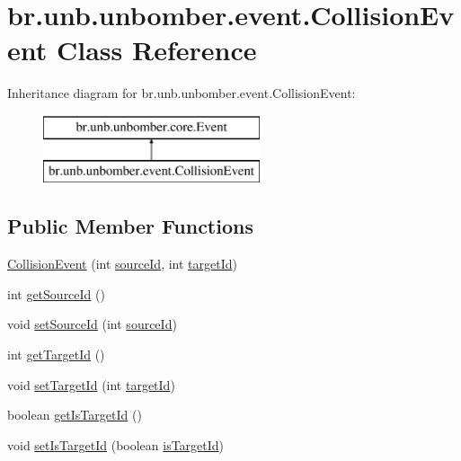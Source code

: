 \hypertarget{classbr_1_1unb_1_1unbomber_1_1event_1_1_collision_event}{\section{br.\+unb.\+unbomber.\+event.\+Collision\+Event Class Reference}
\label{classbr_1_1unb_1_1unbomber_1_1event_1_1_collision_event}
}
Inheritance diagram for br.\+unb.\+unbomber.\+event.\+Collision\+Event\+:\begin{figure}[H]
\begin{center}
\leavevmode
\includegraphics[height=2.000000cm]{classbr_1_1unb_1_1unbomber_1_1event_1_1_collision_event}
\end{center}
\end{figure}
\subsection*{Public Member Functions}
\begin{DoxyCompactItemize}
\item 
\hyperlink{classbr_1_1unb_1_1unbomber_1_1event_1_1_collision_event_ab0f58187e39af806abfcc6d635abfe55}{Collision\+Event} (int \hyperlink{classbr_1_1unb_1_1unbomber_1_1event_1_1_collision_event_a3115ab5eb686ecea5e7629e6fbb02be4}{source\+Id}, int \hyperlink{classbr_1_1unb_1_1unbomber_1_1event_1_1_collision_event_a3b46d8cfa814478929fb264594f4c1eb}{target\+Id})
\item 
int \hyperlink{classbr_1_1unb_1_1unbomber_1_1event_1_1_collision_event_a623f5db9c099c2214b53a775bc23e73a}{get\+Source\+Id} ()
\item 
void \hyperlink{classbr_1_1unb_1_1unbomber_1_1event_1_1_collision_event_ab4099a6edd6259c9b2c059c5753cd993}{set\+Source\+Id} (int \hyperlink{classbr_1_1unb_1_1unbomber_1_1event_1_1_collision_event_a3115ab5eb686ecea5e7629e6fbb02be4}{source\+Id})
\item 
int \hyperlink{classbr_1_1unb_1_1unbomber_1_1event_1_1_collision_event_aa851138a5289916a546496ae46cb5dd4}{get\+Target\+Id} ()
\item 
void \hyperlink{classbr_1_1unb_1_1unbomber_1_1event_1_1_collision_event_a1b692c5734d3115949529762cbab6634}{set\+Target\+Id} (int \hyperlink{classbr_1_1unb_1_1unbomber_1_1event_1_1_collision_event_a3b46d8cfa814478929fb264594f4c1eb}{target\+Id})
\item 
boolean \hyperlink{classbr_1_1unb_1_1unbomber_1_1event_1_1_collision_event_a59c625d0fe102b8ded4343666f602bf7}{get\+Is\+Target\+Id} ()
\item 
void \hyperlink{classbr_1_1unb_1_1unbomber_1_1event_1_1_collision_event_a0d5ba50a8fb764af1ce61118f3c96f79}{set\+Is\+Target\+Id} (boolean \hyperlink{classbr_1_1unb_1_1unbomber_1_1event_1_1_collision_event_a84a28b5d5ed39f6de13ab961f8fc6a84}{is\+Target\+Id})
\end{DoxyCompactItemize}
